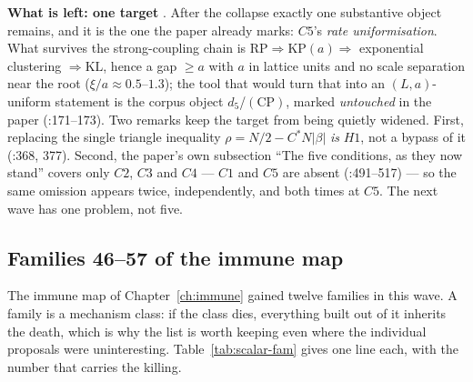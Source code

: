 \textbf{What is left: one target} \LM. After the collapse exactly one substantive object remains,
and it is the one the paper already marks: $C5$'s \emph{rate uniformisation}. What survives the
strong-coupling chain is
$\mathrm{RP}\Rightarrow\mathrm{KP}(a)\Rightarrow$ exponential clustering $\Rightarrow\mathrm{KL}$,
hence a gap $\ge a$ with $a$ in lattice units and no scale separation near the root
($\xi/a\approx0.5$--$1.3$); the tool that would turn that into an $(L,a)$-uniform statement is the
corpus object $d_5$/$(\mathrm{CP})$, marked \emph{untouched} in the paper
(:171--173). Two remarks keep the target from being quietly widened. First,
replacing the single triangle inequality $\rho=N/2-C^*N\lvert\beta\rvert$ \emph{is} $H1$, not a
bypass of it (:368, 377). Second, the paper's own subsection ``The five
conditions, as they now stand'' covers only $C2$, $C3$ and $C4$ --- $C1$ and $C5$ are absent
(:491--517) --- so the same omission appears twice, independently, and both
times at $C5$. The next wave has one problem, not five.

\subsection{Families 46--57 of the immune map}
\label{sec:scalar-families}

The immune map of Chapter~\ref{ch:immune} gained twelve families in this wave. A family is a
mechanism class: if the class dies, everything built out of it inherits the death, which is why the
list is worth keeping even where the individual proposals were uninteresting.
Table~\ref{tab:scalar-fam} gives one line each, with the number that carries the killing.


